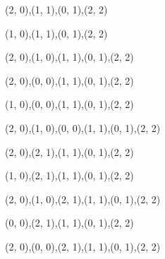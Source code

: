 \begin{figure}
\begin{subfigure}[b]{0.14\textwidth}
    \resizebox{\linewidth}{!} {
       {{(2, 0),(1, 1),(0, 1),(2, 2)}} {{}}
    }
  \end{subfigure}
  \begin{subfigure}[b]{0.14\textwidth}
    \resizebox{\linewidth}{!} {
       {{(1, 0),(1, 1),(0, 1),(2, 2)}} {{}}
    }
  \end{subfigure}
  \begin{subfigure}[b]{0.14\textwidth}
    \resizebox{\linewidth}{!} {
       {{(2, 0),(1, 0),(1, 1),(0, 1),(2, 2)}} {{}}
    }
  \end{subfigure}
  \begin{subfigure}[b]{0.14\textwidth}
    \resizebox{\linewidth}{!} {
       {{(2, 0),(0, 0),(1, 1),(0, 1),(2, 2)}} {{}}
    }
  \end{subfigure}
  \begin{subfigure}[b]{0.14\textwidth}
    \resizebox{\linewidth}{!} {
       {{(1, 0),(0, 0),(1, 1),(0, 1),(2, 2)}} {{}}
    }
  \end{subfigure}
  \begin{subfigure}[b]{0.14\textwidth}
    \resizebox{\linewidth}{!} {
       {{(2, 0),(1, 0),(0, 0),(1, 1),(0, 1),(2, 2)}} {{}}
    }
  \end{subfigure}
  \begin{subfigure}[b]{0.14\textwidth}
    \resizebox{\linewidth}{!} {
       {{(2, 0),(2, 1),(1, 1),(0, 1),(2, 2)}} {{}}
    }
  \end{subfigure}
  \begin{subfigure}[b]{0.14\textwidth}
    \resizebox{\linewidth}{!} {
       {{(1, 0),(2, 1),(1, 1),(0, 1),(2, 2)}} {{}}
    }
  \end{subfigure}
  \begin{subfigure}[b]{0.14\textwidth}
    \resizebox{\linewidth}{!} {
       {{(2, 0),(1, 0),(2, 1),(1, 1),(0, 1),(2, 2)}} {{}}
    }
  \end{subfigure}
  \begin{subfigure}[b]{0.14\textwidth}
    \resizebox{\linewidth}{!} {
       {{(0, 0),(2, 1),(1, 1),(0, 1),(2, 2)}} {{}}
    }
  \end{subfigure}
  \begin{subfigure}[b]{0.14\textwidth}
    \resizebox{\linewidth}{!} {
       {{(2, 0),(0, 0),(2, 1),(1, 1),(0, 1),(2, 2)}} {{}}
    }
  \end{subfigure}
  \begin{subfigure}[b]{0.14\textwidth}

\end{subfigure}
\end{figure}
